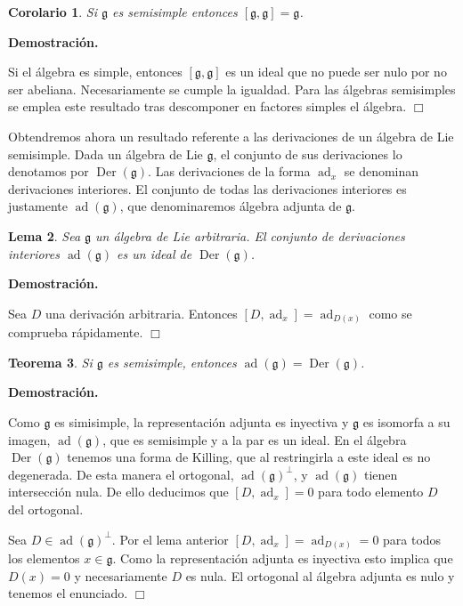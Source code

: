 \documentclass[a4paper,draft,12pt]{article}
\newtheorem{teo}{Teorema}[section]%
\newtheorem{lema}[teo]{Lema}%
\newtheorem{cor}[teo]{Corolario}%
\newcommand{\dem}{\noindent \textbf{Demostración. }\vspace{0.3 cm}}%
\newcommand{\g}{\mathfrak{g}}%
\newcommand{\fin}{ $\Box $ \vspace{0.4 cm}}
\newcommand{\df}[1]{\textsf{\color{blue}#1}}
\DeclareMathOperator{\Der}{Der}%
\DeclareMathOperator{\ad}{ad}  %
\begin{document}
\begin{cor}

Si $\g$ es semisimple entonces $[\g,\g]=\g$.

\end{cor}

\dem

Si el álgebra es simple, entonces $[\g,\g]$ es un ideal que no puede ser nulo por no ser abeliana.  Necesariamente se cumple la igualdad. Para las álgebras semisimples se emplea este resultado tras descomponer en factores simples el álgebra.  \fin

Obtendremos ahora un resultado referente a las derivaciones de un álgebra de Lie semisimple.  Dada un álgebra de Lie $\g$, el conjunto de sus derivaciones lo denotamos por $\Der(\g)$.  Las derivaciones de la forma $\ad_x$ se denominan derivaciones interiores.  El conjunto de todas las derivaciones interiores es justamente $\ad(\g)$, que denominaremos  \df{álgebra adjunta}  de $\g$.  

\begin{lema}

Sea $\g$ un  álgebra de Lie arbitraria.  El conjunto de derivaciones interiores $\ad(\g)$ es un ideal de $\Der(\g)$.

\end{lema}

\dem

Sea $D$ una derivación arbitraria.  Entonces $[D, \ad_x]= \ad_{D(x)}$ como se comprueba rápidamente.  \fin

\begin{teo}

Si $\g$ es semisimple, entonces $\ad(\g)= \Der(\g)$.  

\end{teo}

\dem

Como $\g$ es simisimple, la representación adjunta es inyectiva y $\g$ es isomorfa a su imagen, $\ad(\g)$, que es semisimple y a la par es un ideal.  En el álgebra $\Der(\g)$ tenemos una forma de Killing, que al restringirla a este ideal es no degenerada.  De esta manera el ortogonal, $\ad(\g)^\perp$, y $\ad(\g)$ tienen intersección nula.    De ello deducimos que $[D, \ad_x]=0$ para todo elemento $D$ del ortogonal. 

Sea $D\in \ad(\g)^\perp$.  Por el lema anterior $[D,\ad_x]= \ad_{D(x)}=0$ para todos los elementos $x \in \g$. Como la representación adjunta es inyectiva esto implica que $D(x)=0$ y necesariamente $D$ es nula.  El ortogonal al álgebra adjunta es nulo y tenemos el enunciado. \fin
\end{document}
